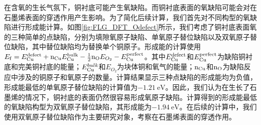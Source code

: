 在含氧的生长气氛下，铜衬底可能产生氧缺陷。而铜衬底表面的氧缺陷可能会对在石墨烯表面的穿透作用产生影响。为了简化后续计算，我们首先对不同构型的氧缺陷进行形成能计算。如图\ref{fig:FLG_DFT_Odefect}所示，我们考虑了铜衬底表面氧的三种简单的点缺陷，分别为\chinesecolon 填隙氧原子缺陷、单氧原子替位缺陷以及双氧原子替位缺陷，其中替位缺陷均为替换单个铜原子。形成能的计算使用$E_{\rm f}=E_{\rm Cu}^{\rm defect}+{\rm n_{Cu}}E_{\rm Cu}^{\rm bulk}-\frac{1}{2}{\rm n_{O}}E_{O_{2}} - E_{\rm Cu}^{\rm perfect}$。其中$E_{\rm Cu}^{\rm defect}$和$E_{\rm Cu}^{\rm perfect}$为缺陷铜衬底和完美铜衬底的能量；$E_{\rm Cu}^{bulk}$和$E_{O_{2}}$为块体铜和氧气的能量；${\rm n_{Cu}}$和${\rm n_{O}}$为缺陷反应中涉及的铜原子和氧原子的数量。计算结果显示三种点缺陷的形成能均为负值，形成能最低的单氧原子替位缺陷的计算值为$\SI{-1.21}{\electronvolt}$。因此，我们认为在生长了石墨烯的情况下，铜衬底的表面仍然很容易形成氧原子缺陷。计算得到的形成能最低的氧缺陷构型为双氧原子替位缺陷，其形成能为$\SI{-1.94}{\electronvolt}$。在后续的计算中，我们使用双氧原子替位缺陷作为主要研究对象，考察在石墨烯表面的穿透作用。

